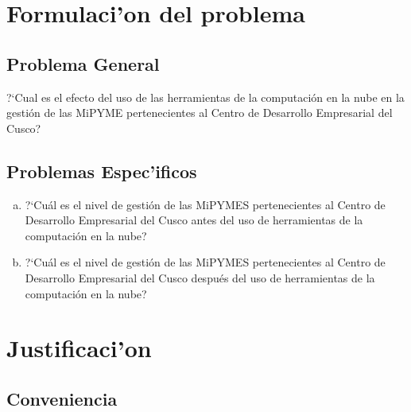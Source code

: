 \section{Formulaci'on del problema}
\subsection{Problema General}
?`Cual es el efecto del uso de las herramientas de la computaci\'on en la nube
en la gesti\'on de las MiPYME pertenecientes al Centro de Desarrollo Empresarial
del Cusco?
\subsection{Problemas Espec'ificos}
\begin{enumerate}[a.]
\item ?`Cu\'al es el nivel de gesti\'on de las MiPYMES pertenecientes al Centro
de Desarrollo Empresarial del Cusco antes del uso de herramientas de la computaci\'on
en la nube?
\item ?`Cu\'al es el nivel de gesti\'on de las MiPYMES pertenecientes al Centro
de Desarrollo Empresarial del Cusco despu\'es del uso de herramientas de la computaci\'on
en la nube?
\end{enumerate}

%
\section{Justificaci'on}
\subsection{Conveniencia}

